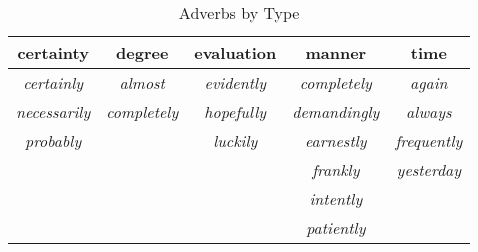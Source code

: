 \documentclass[doc,12pt,natbib]{apa6}
\begin{document}
\begin{table}
\begin{threeparttable}
\begin{tabular}{ c c c c c }
	\toprule
	certainty & degree & evaluation & manner & time \\
	\midrule
	\textit{certainly} & \textit{almost} & \textit{evidently} & \textit{completely} & \textit{again} \\
	\textit{necessarily} & \textit{completely} & \textit{hopefully} & \textit{demandingly} & \textit{always} \\
	\textit{probably} & & \textit{luckily} & \textit{earnestly} & \textit{frequently} \\
	& & & \textit{frankly} & \textit{yesterday} \\
	& & & \textit{intently} & \\
	& & & \textit{patiently} & \\
	\bottomrule
\end{tabular}
\end{threeparttable}
\caption{Adverbs by Type}
\label{table:AdvClass}
\end{table}

\clearpage

\end{document}
